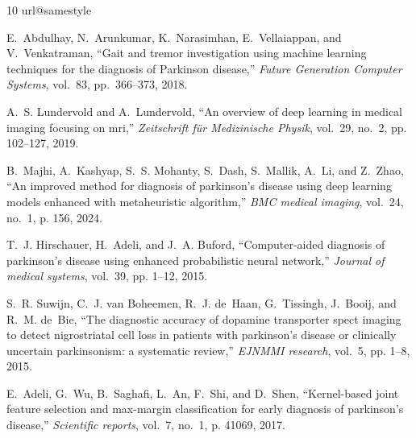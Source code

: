 \documentclass{article}
\begin{document}
\begin{thebibliography}{10}
\setlength{\itemsep}{0.2em}
\setlength{\parskip}{0pt}
\providecommand{\url}[1]{#1}
\csname url@samestyle\endcsname
\providecommand{\newblock}{\relax}
\providecommand{\bibinfo}[2]{#2}
\providecommand{\BIBentrySTDinterwordspacing}{\spaceskip=0pt\relax}
\providecommand{\BIBentryALTinterwordstretchfactor}{4}
\providecommand{\BIBentryALTinterwordspacing}{\spaceskip=\fontdimen2\font plus
\BIBentryALTinterwordstretchfactor\fontdimen3\font minus
  \fontdimen4\font\relax}
\providecommand{\BIBforeignlanguage}[2]{{%
\expandafter\ifx\csname l@#1\endcsname\relax
\typeout{** WARNING: IEEEtran.bst: No hyphenation pattern has been}%
\typeout{** loaded for the language `#1'. Using the pattern for}%
\typeout{** the default language instead.}%
\else
\language=\csname l@#1\endcsname
\fi
#2}}
\providecommand{\BIBdecl}{\relax}
\BIBdecl

E.~Abdulhay, N.~Arunkumar, K.~Narasimhan, E.~Vellaiappan, and V.~Venkatraman,
``Gait and tremor investigation using machine learning techniques for the diagnosis of Parkinson disease,''
\emph{Future Generation Computer Systems}, vol.~83, pp.~366--373, 2018.

A.~S. Lundervold and A.~Lundervold, ``An overview of deep learning in medical
  imaging focusing on mri,'' \emph{Zeitschrift f{\"u}r Medizinische Physik},
  vol.~29, no.~2, pp. 102--127, 2019.

B.~Majhi, A.~Kashyap, S.~S. Mohanty, S.~Dash, S.~Mallik, A.~Li, and Z.~Zhao,
  ``An improved method for diagnosis of parkinson’s disease using deep
  learning models enhanced with metaheuristic algorithm,'' \emph{BMC medical
  imaging}, vol.~24, no.~1, p. 156, 2024.

T.~J. Hirschauer, H.~Adeli, and J.~A. Buford, ``Computer-aided diagnosis of
  parkinson’s disease using enhanced probabilistic neural network,''
  \emph{Journal of medical systems}, vol.~39, pp. 1--12, 2015.

S.~R. Suwijn, C.~J. van Boheemen, R.~J. de~Haan, G.~Tissingh, J.~Booij, and
  R.~M. de~Bie, ``The diagnostic accuracy of dopamine transporter spect imaging
  to detect nigrostriatal cell loss in patients with parkinson’s disease or
  clinically uncertain parkinsonism: a systematic review,'' \emph{EJNMMI
  research}, vol.~5, pp. 1--8, 2015.

E.~Adeli, G.~Wu, B.~Saghafi, L.~An, F.~Shi, and D.~Shen, ``Kernel-based joint
  feature selection and max-margin classification for early diagnosis of
  parkinson’s disease,'' \emph{Scientific reports}, vol.~7, no.~1, p. 41069,
  2017.


\end{thebibliography}
\end{document}

